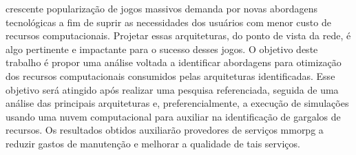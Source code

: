 crescente popularização de jogos massivos demanda por novas abordagens tecnológicas a fim de suprir as necessidades dos usuários com menor custo de recursos computacionais.
%
Projetar essas arquiteturas, do ponto de vista da rede, é algo pertinente e impactante para o sucesso desses jogos.
%
O objetivo deste trabalho é propor uma análise voltada a identificar abordagens para otimização dos recursos computacionais consumidos pelas arquiteturas identificadas.
%
Esse objetivo será atingido após realizar uma pesquisa referenciada, seguida de uma análise das principais arquiteturas e, preferencialmente, a execução de simulações usando uma nuvem computacional para auxiliar na identificação de gargalos de recursos. Os resultados obtidos auxiliarão provedores de serviços \ac{mmorpg} a reduzir gastos de manutenção e melhorar a qualidade de tais serviços.
